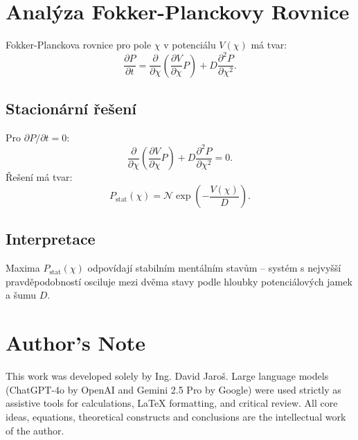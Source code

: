 \documentclass{article}
\begin{document}
\section*{Analýza Fokker-Planckovy Rovnice}

Fokker-Planckova rovnice pro pole $\chi$ v potenciálu $V(\chi)$ má tvar:
\[
\frac{\partial P}{\partial t} = \frac{\partial}{\partial \chi} \left( \frac{\partial V}{\partial \chi} P \right) + D \frac{\partial^2 P}{\partial \chi^2}.
\]

\subsection*{Stacionární řešení}
Pro $\partial P/\partial t = 0$:
\[
\frac{\partial}{\partial \chi} \left( \frac{\partial V}{\partial \chi} P \right) + D \frac{\partial^2 P}{\partial \chi^2} = 0.
\]
Řešení má tvar:
\[
P_{\text{stat}}(\chi) = \mathcal{N} \exp\left(-\frac{V(\chi)}{D}\right).
\]

\subsection*{Interpretace}
Maxima $P_{\text{stat}}(\chi)$ odpovídají stabilním mentálním stavům – systém s nejvyšší pravděpodobností osciluje mezi dvěma stavy podle hloubky potenciálových jamek a šumu $D$.


\section*{Author's Note}

This work was developed solely by Ing. David Jaroš.  
Large language models (ChatGPT-4o by OpenAI and Gemini 2.5 Pro by Google) were used strictly as assistive tools for calculations, LaTeX formatting, and critical review.  
All core ideas, equations, theoretical constructs and conclusions are the intellectual work of the author.
\end{document}
